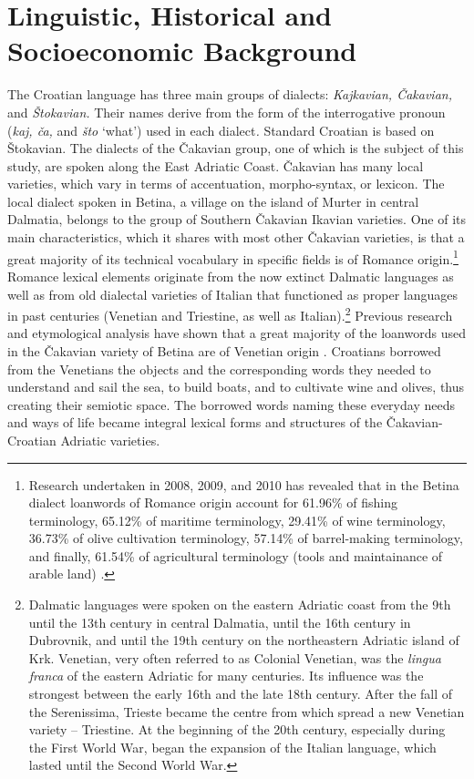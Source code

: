 \documentclass[output=paper]{LSP/langsci}
\begin{document}
\section{Linguistic, Historical and Socioeconomic Background}
The Croatian language has three main groups of dialects: \textit{Kajkavian, Čakavian,} and \textit{Štokavian.} Their names derive from the form of the interrogative pronoun (\textit{kaj, ča, }and \textit{što }‘what’) used in each dialect\textit{.} Standard Croatian is based on Štokavian. The dialects of the Čakavian group, one of which is the subject of this study, are spoken along the East Adriatic Coast. Čakavian has many local varieties, which vary in terms of accentuation, morpho-syntax, or lexicon. The local dialect spoken in Betina, a village on the island of Murter in central Dalmatia, belongs to the group of Southern Čakavian Ikavian varieties. One of its main characteristics, which it shares with most other Čakavian varieties, is that a great majority of its technical vocabulary in specific fields is of Romance origin.\footnote{Research undertaken in 2008, 2009, and 2010 has revealed that in the Betina dialect loanwords of Romance origin account for 61.96\% of fishing terminology, 65.12\% of maritime terminology, 29.41\% of wine terminology, 36.73\% of olive cultivation terminology, 57.14\% of barrel-making terminology, and finally, 61.54\% of agricultural terminology (tools and maintainance of arable land) \citep[254--255]{skevin_etimoloska_2010}.} Romance lexical elements originate from the now extinct Dalmatic languages as well as from old dialectal varieties of Italian that functioned as proper languages in past centuries (Venetian and Triestine, as well as Italian).\footnote{ Dalmatic languages were spoken on the eastern Adriatic coast from the 9th until the 13th century in central Dalmatia, until the 16th century in Dubrovnik, and until the 19th century on the northeastern Adriatic island of Krk. Venetian, very often referred to as Colonial Venetian, was the \textit{lingua franca }of the eastern Adriatic for many centuries. Its influence was the strongest between the early 16th and the late 18th century. After the fall of the Serenissima, Trieste became the centre from which spread a new Venetian variety – Triestine. At the beginning of the 20th century, especially during the First World War, began the expansion of the Italian language, which lasted until the Second World War.} Previous research and etymological analysis have shown that a great majority of the loanwords used in the Čakavian variety of Betina are of Venetian origin \citep{filipi_betinska_1997,skevin_etimoloska_2010}. Croatians borrowed from the Venetians the objects and the corresponding words they needed to understand and sail the sea, to build boats, and to cultivate wine and olives, thus creating their semiotic space. The borrowed words naming these everyday needs and ways of life became integral lexical forms and structures of the Čakavian-Croatian Adriatic varieties.
\end{document}
